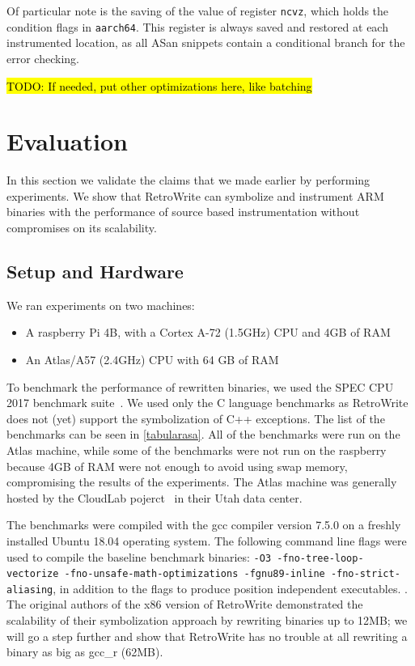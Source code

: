 \documentclass[a4paper,11pt,oneside]{report}
\newcommand{\sysname}{RetroWrite\xspace}
\DeclareRobustCommand{\todo}[1]{{\sethlcolor{cyan}\hl{TODO: #1}}}
\begin{document}
Of particular note is the saving of the value of register \texttt{ncvz}, which 
holds the condition flags in \texttt{aarch64}. This register is always saved 
and restored at each instrumented location, as all ASan snippets contain a 
conditional branch for the error checking. 

\todo{If needed, put other optimizations here, like batching}


\chapter{Evaluation}



In this section we validate the claims that we made earlier by performing experiments.
We show that \sysname can symbolize and instrument ARM binaries with the performance of
source based instrumentation without compromises on its scalability.

\section{Setup and Hardware} 
We ran experiments on two machines:
\begin{itemize}
	\item A raspberry Pi 4B, with a Cortex A-72 (1.5GHz) CPU and 4GB of RAM
	\item An Atlas/A57 (2.4GHz) CPU with 64 GB of RAM
\end{itemize}

To benchmark the performance of rewritten binaries, we used the SPEC CPU 2017
benchmark suite~\cite{speccpu2017}.  We used only the C language benchmarks as
\sysname does not (yet) support the symbolization of C++ exceptions. The list of the
benchmarks can be seen in \autoref{tabularasa}.  All of the benchmarks were run on
the Atlas machine, while some of the benchmarks were not run on the raspberry because
4GB of RAM were not enough to avoid using swap memory, compromising the results
of the experiments. The Atlas machine was generally hosted by the CloudLab
pojerct~\cite{cloudlab} in their Utah data center. 

The benchmarks were compiled with the gcc compiler version 7.5.0 on a
freshly installed Ubuntu 18.04 operating system. The following command line
flags were used to compile the baseline benchmark binaries: \texttt{-O3
-fno-tree-loop-vectorize -fno-unsafe-math-optimizations -fgnu89-inline -fno-strict-aliasing}, in addition to the flags to produce position independent executables. 
.  The original authors of the x86 version of \sysname demonstrated the
scalability of their symbolization approach by rewriting binaries up to 12MB;\@
we will go a step further and show that \sysname has no trouble at all
rewriting a binary as big as gcc\_r (62MB).
\end{document}
